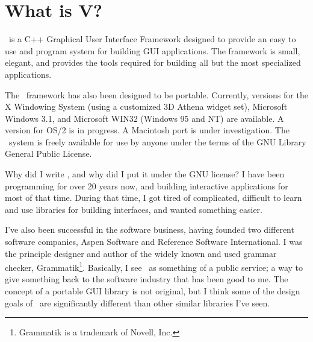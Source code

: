 \chapter {What is V?}

 \setcounter{page}{1}

\V\ is a C++ Graphical User Interface Framework designed
to provide an easy to use and program system for building GUI
applications. The framework is small, elegant, and provides the
tools required for building all but the most specialized
applications.

The \V\ framework has also been designed to be portable.
Currently, versions for the X Windowing System (using a
customized 3D Athena widget set), Microsoft Windows 3.1, and
Microsoft WIN32 (Windows 95 and NT) are available. A version for
OS/2 is in progress. A Macintosh port is under investigation. The
\V\ system is freely available for use by anyone under the terms
of the GNU Library General Public License.

Why did I write \V, and why did I put it under the GNU license? I
have been programming for over 20 years now, and building
interactive applications for most of that time. During that time,
I got tired of complicated, difficult to learn and use libraries
for building interfaces, and wanted something easier.

I've also been successful in the software business, having founded
two different software companies, Aspen Software and Reference
Software International. I was the principle designer and author
of the widely known and used grammar checker,
Grammatik\footnote{Grammatik is a trademark of Novell, Inc.}.
Basically, I see \V\ as something of a public service; a way
to give something back to the software industry that has been
good to me. The concept of a portable GUI library is not
original, but I think some of the design goals of \V\ are
significantly different than other similar libraries I've seen.


